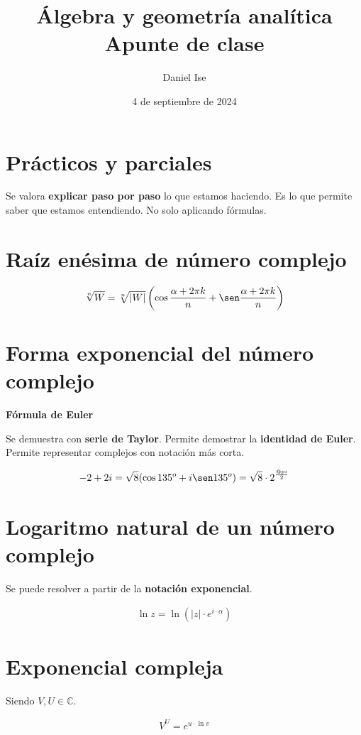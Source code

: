 \documentclass{article}
\title{Álgebra y geometría analítica\\Apunte de clase}
\author{Daniel Ise}
\date{4 de septiembre de 2024}
\begin{document}
\maketitle

\tableofcontents

\section{Prácticos y parciales}

Se valora \textbf{explicar paso por paso} lo que estamos haciendo.
Es lo que permite saber que estamos entendiendo.
No solo aplicando fórmulas.

\section{Raíz enésima de número complejo}

\begin{align*}
    \sqrt[n]{W} = \sqrt[n]{|W|} \left(\cos \frac{\alpha + 2\pi k}{n} + \sen \frac{\alpha + 2\pi k}{n} \right)
\end{align*}

\section{Forma exponencial del número complejo}

\textbf{Fórmula de Euler}

Se demuestra con \textbf{serie de Taylor}. 
Permite demostrar la \textbf{identidad de Euler}.
Permite representar complejos con notación más corta.

\begin{align*}
    -2+2i = \sqrt{8}(\cos 135^o + i \sen 135^o) = \sqrt{8} \cdot 2^{\frac{@pi}{2}}
\end{align*}

\section{Logaritmo natural de un número complejo}

Se puede resolver a partir de la \textbf{notación exponencial}.

\begin{align*}
    \ln z = \ln (|z|\cdot e^{i\cdot\alpha})
\end{align*}

\section{Exponencial compleja}

Siendo \(V, U \in \mathbb{C}\).

\begin{align*}
    V^{U} = e^{u \cdot\ln v}
\end{align*}
\end{document}
